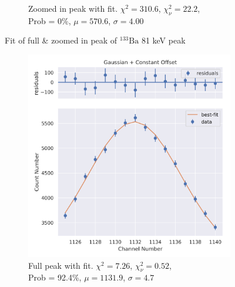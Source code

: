 \documentclass[11pt,a4paper]{article}
\newcommand{\element}[2]{$^{#2}\textrm{#1}$}
\begin{document}
\begin{figure}[H]
\begin{subfigure}{.5\linewidth}
    \caption{Zoomed in peak with fit. $\chi^2 = 310.6$, $\chi^2_\nu = 22.2$, \\ Prob = 0\%, $\mu = 570.6$, $\sigma = 4.00$}
  \end{subfigure}
  \caption{Fit of full \& zoomed in peak of \element{Ba}{133} 81 keV peak}
\end{figure}
\begin{figure}[H]
  \centering
  \begin{subfigure}{.5\linewidth}
    \centering
    \includegraphics[width=\linewidth]{./Images/Barium133/Gauss/Gauss_2_Full.png}
    \caption{Full peak with fit. $\chi^2 = 7.26$, $\chi^2_\nu = 0.52$, \\ Prob = 92.4\%, $\mu = 1131.9$, $\sigma = 4.7$}
  \end{subfigure}%
  \begin{subfigure}{.5\linewidth}
    \centering

\end{subfigure}
\end{figure}
\end{document}
